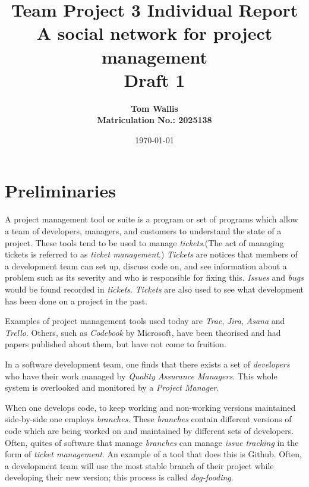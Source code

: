 \documentclass[draft, 10pt]{article}
\author{\bf Tom Wallis \\ \bf Matriculation No.: 2025138}
\date{\today}
\title{Team Project 3 Individual Report\\
A social network for project management\\ \vspace{4mm}
Draft 1}
\begin{document}
\maketitle

\section{Preliminaries}\par
A project management tool or suite is a program or set of programs which allow a team of developers, managers, and customers to understand the state of a project. These tools tend to be used to manage \emph{tickets}.(The act of managing tickets is referred to as \emph{ticket management}.) \emph{Tickets} are notices that members of a development team can set up, discuss code on, and see information about a problem such as its severity and who is responsible for fixing this. \emph{Issues} and \emph{bugs} would be found recorded in \emph{tickets}. \emph{Tickets} are also used to see what development has been done on a project in the past. \par
Examples of project management tools used today are \emph{Trac}, \emph{Jira}, \emph{Asana} and \emph{Trello}. Others, such as \emph{Codebook} by Microsoft, have been theorised and had papers published about them, but have not come to fruition. \par
In a software development team, one finds that there exists a set of \emph{developers} who have their work managed by \emph{Quality Assurance Managers}. This whole system is overlooked and monitored by a \emph{Project Manager}. \par
When one develops code, to keep working and non-working versions maintained side-by-side one employs \emph{branches}. These \emph{branches} contain different versions of code which are being worked on and maintained by different sets of developers. Often, quites of software that manage \emph{branches} can manage \emph{issue tracking} in the form of \emph{ticket management}. An example of a tool that does this is Github. Often, a development team will use the most stable branch of their project while developing their new version; this process is called \emph{dog-fooding}.\par
\end{document}
